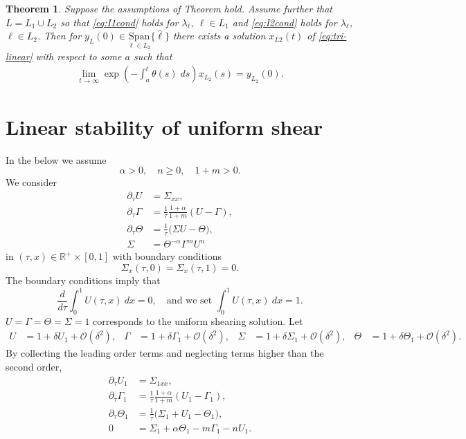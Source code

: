 \documentclass[a4paper,11pt]{article}
\newtheorem{theorem}{Theorem}
\theoremstyle{remark}
\begin{document}
\begin{theorem}
 Suppose the assumptions of Theorem hold. Assume further that $L = L_1 \cup L_2$ so that \eqref{eq:I1cond} holds for $\lambda_\ell$, $\ell\in L_1$ and \eqref{eq:I2cond} holds for $\lambda_\ell$, $\ell\in L_2$. Then for $y_L(0)\in \underset{\ell\in L_2}{ \textrm{Span}}\{\hat{\ell}\}$ there exists a solution $x_{L2}(t)$ of \eqref{eq:tri-linear} with respect to some $a$ such that
\begin{align}
 \lim_{t \rightarrow\infty} \exp\left(-\int_a^t \theta(s)\; ds\right) x_{L_2}(s) = y_{L_2}(0).
\end{align}
\end{theorem}



\section{Linear stability of uniform shear}
In the below we assume
$$ \alpha>0, \quad n\ge0, \quad 1+m>0.$$
We consider
\begin{equation} \label{eq:system}
 \begin{aligned}
  \partial_\tau U &= \Sigma_{xx},\\
  \partial_\tau\Gamma &= \frac{1}{\tau}\frac{1+\alpha}{1+m}(U-\Gamma),\\
  \partial_\tau\Theta &= \frac{1}{\tau}\Big(\Sigma U -\Theta\Big),\\
  \Sigma &= \Theta^{-\alpha}\Gamma^m U^n
 \end{aligned}
\end{equation}
in $(\tau,x)\in \mathbb{R}^+\times [0,1]$ with boundary conditions
\begin{equation}
 \Sigma_x(\tau,0)=\Sigma_x(\tau,1)=0.
\end{equation}
The boundary conditions imply that
\begin{equation}
 \frac{d}{d\tau}\int_0^1 U(\tau,x) \: dx = 0, \quad \text{and we set } \int_0^1 U(\tau,x) \: dx = 1.
\end{equation}
$ U=\Gamma=\Theta=\Sigma=1 $ corresponds to the uniform shearing solution.
Let
\begin{align*}
 U &= 1 + \delta U_1 + \mathcal{O}(\delta^2), & \Gamma &= 1 + \delta \Gamma_1 + \mathcal{O}(\delta^2), &
 \Sigma &= 1 + \delta \Sigma_1 + \mathcal{O}(\delta^2), & \Theta &= 1 + \delta \Theta_1 + \mathcal{O}(\delta^2).
\end{align*}
By collecting the leading order terms and neglecting terms higher than the  second order,
\begin{equation} \label{eq:linsystem}
 \begin{aligned}
  \partial_\tau U_1 &= \Sigma_{1xx},\\
  \partial_\tau\Gamma_1 &= \frac{1}{\tau}\frac{1+\alpha}{1+m}(U_1-\Gamma_1),\\
  \partial_\tau\Theta_1 &= \frac{1}{\tau}\Big(\Sigma_1+ U_1 -\Theta_1\Big),\\
  0&=\Sigma_1 + \alpha\Theta_1 -m\Gamma_1 - nU_1 .
 \end{aligned}
\end{equation}
\end{document}
